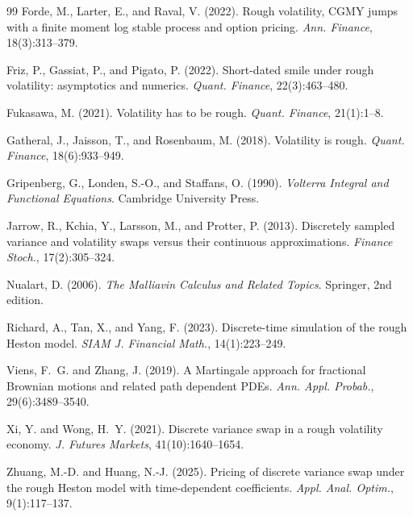 \documentclass[12pt]{article}
\theoremstyle{definition}
\begin{document}
\begin{thebibliography}{99}
Forde, M., Larter, E., and Raval, V. (2022).
Rough volatility, CGMY jumps with a finite moment log
stable process and option pricing.
\emph{Ann. Finance}, 18(3):313--379.

Friz, P., Gassiat, P., and Pigato, P. (2022).
Short-dated smile under rough volatility: asymptotics and
numerics.
\emph{Quant. Finance}, 22(3):463--480.

Fukasawa, M. (2021).
Volatility has to be rough.
\emph{Quant. Finance}, 21(1):1--8.

Gatheral, J., Jaisson, T., and Rosenbaum, M. (2018).
Volatility is rough.
\emph{Quant. Finance}, 18(6):933--949.

Gripenberg, G., Londen, S.-O., and Staffans, O. (1990).
\emph{Volterra Integral and Functional Equations}.
Cambridge University Press.

Jarrow, R., Kchia, Y., Larsson, M., and Protter, P. (2013).
Discretely sampled variance and volatility swaps versus their
continuous approximations.
\emph{Finance Stoch.}, 17(2):305--324.

Nualart, D. (2006).
\emph{The Malliavin Calculus and Related Topics}.
Springer, 2nd edition.

Richard, A., Tan, X., and Yang, F. (2023).
Discrete-time simulation of the rough Heston model.
\emph{SIAM J. Financial Math.}, 14(1):223--249.

Viens, F.~G. and Zhang, J. (2019).
A Martingale approach for fractional Brownian motions and related
path dependent PDEs.
\emph{Ann. Appl. Probab.}, 29(6):3489--3540.

Xi, Y. and Wong, H.~Y. (2021).
Discrete variance swap in a rough volatility economy.
\emph{J. Futures Markets}, 41(10):1640--1654.

Zhuang, M.-D. and Huang, N.-J. (2025).
Pricing of discrete variance swap under the rough Heston model
with time-dependent coefficients.
\emph{Appl. Anal. Optim.}, 9(1):117--137.

\end{thebibliography}
\end{document}
